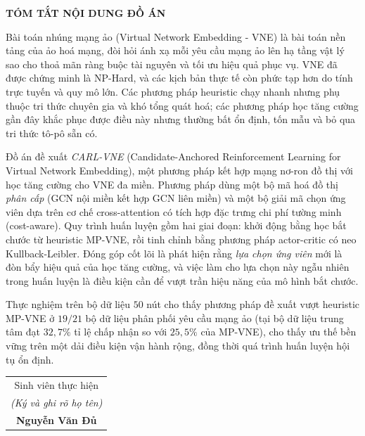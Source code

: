 \documentclass[../DoAn.tex]{subfiles}
\begin{document}
\begin{center}
    \Large{\textbf{TÓM TẮT NỘI DUNG ĐỒ ÁN}}\\
\end{center}
\vspace{1cm}
Bài toán nhúng mạng ảo (Virtual Network Embedding - VNE) là bài toán nền tảng của ảo hoá mạng, đòi hỏi ánh xạ mỗi yêu cầu mạng ảo lên hạ tầng vật lý sao cho thoả mãn ràng buộc tài nguyên và tối ưu hiệu quả phục vụ. VNE đã được chứng minh là NP-Hard, và các kịch bản thực tế còn phức tạp hơn do tính trực tuyến và quy mô lớn. Các phương pháp heuristic chạy nhanh nhưng phụ thuộc tri thức chuyên gia và khó tổng quát hoá; các phương pháp học tăng cường gần đây khắc phục được điều này nhưng thường bất ổn định, tốn mẫu và bỏ qua tri thức tô-pô sẵn có.

Đồ án đề xuất \textit{CARL-VNE} (Candidate-Anchored Reinforcement Learning for Virtual Network Embedding), một phương pháp kết hợp mạng nơ-ron đồ thị với học tăng cường cho VNE đa miền. Phương pháp dùng một bộ mã hoá đồ thị \textit{phân cấp} (GCN nội miền kết hợp GCN liên miền) và một bộ giải mã chọn ứng viên dựa trên cơ chế cross-attention có tích hợp đặc trưng chi phí tường minh (cost-aware). Quy trình huấn luyện gồm hai giai đoạn: khởi động bằng học bắt chước từ heuristic MP-VNE, rồi tinh chỉnh bằng phương pháp actor-critic có neo Kullback-Leibler. Đóng góp cốt lõi là phát hiện rằng \textit{lựa chọn ứng viên} mới là đòn bẩy hiệu quả của học tăng cường, và việc làm cho lựa chọn này ngẫu nhiên trong huấn luyện là điều kiện cần để vượt trần hiệu năng của mô hình bắt chước.

Thực nghiệm trên bộ dữ liệu $50$ nút cho thấy phương pháp đề xuất vượt heuristic MP-VNE ở $19/21$ bộ dữ liệu phân phối yêu cầu mạng ảo (tại bộ dữ liệu trung tâm đạt $32{,}7\%$ tỉ lệ chấp nhận so với $25{,}5\%$ của MP-VNE), cho thấy ưu thế bền vững trên một dải điều kiện vận hành rộng, đồng thời quá trình huấn luyện hội tụ ổn định.

\begin{flushright}
\begin{tabular}{@{}c@{}}
Sinh viên thực hiện\\
\textit{(Ký và ghi rõ họ tên)}\\[2.5cm]
\textbf{Nguyễn Văn Đủ}
\end{tabular}
\end{flushright}
\end{document}
